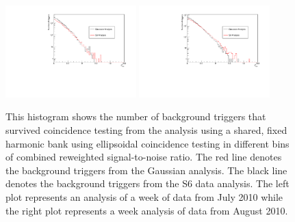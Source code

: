 \documentclass[12pt]{iopart} \usepackage{graphicx,amssymb}
\begin{document}
\begin{figure}[tbp]
\begin{center}
\includegraphics[width=0.45\textwidth]{figures/histograms/same_harm_ethinca_gaussian_vs_s6_w1.pdf}
\includegraphics[width=0.45\textwidth]{figures/histograms/same_harm_ethinca_gaussian_vs_s6_w2.pdf}
\caption{This histogram shows the number of background triggers that survived
coincidence testing from the analysis using a shared, fixed harmonic bank using
ellipsoidal coincidence testing in different bins of combined reweighted signal-to-noise ratio.
The red line denotes the background triggers from the Gaussian analysis.  The
black line denotes the background triggers from the S6 data analysis. The left
plot represents an analysis of a week of data from July 2010 while the right plot represents a
week analysis of data from August 2010.}
\label{fig:ethinca_hist}
\end{center}
\end{figure}
\end{document}
